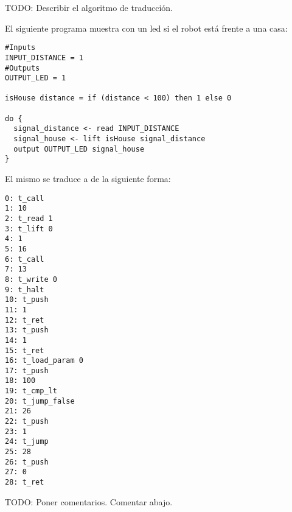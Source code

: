 
TODO: Describir el algoritmo de traducción.

El siguiente programa \frob{} muestra con un led si el robot está
frente a una casa:

\begin{Verbatim}
#Inputs
INPUT_DISTANCE = 1
#Outputs
OUTPUT_LED = 1

isHouse distance = if (distance < 100) then 1 else 0

do {
  signal_distance <- read INPUT_DISTANCE
  signal_house <- lift isHouse signal_distance
  output OUTPUT_LED signal_house
}
\end{Verbatim}

El mismo se traduce a \alf{} de la siguiente forma:

\begin{Verbatim}
0: t_call
1: 10
2: t_read 1
3: t_lift 0
4: 1
5: 16
6: t_call
7: 13
8: t_write 0
9: t_halt
10: t_push
11: 1
12: t_ret
13: t_push
14: 1
15: t_ret
16: t_load_param 0
17: t_push
18: 100
19: t_cmp_lt
20: t_jump_false
21: 26
22: t_push
23: 1
24: t_jump
25: 28
26: t_push
27: 0
28: t_ret
\end{Verbatim}

TODO: Poner comentarios. Comentar abajo.

